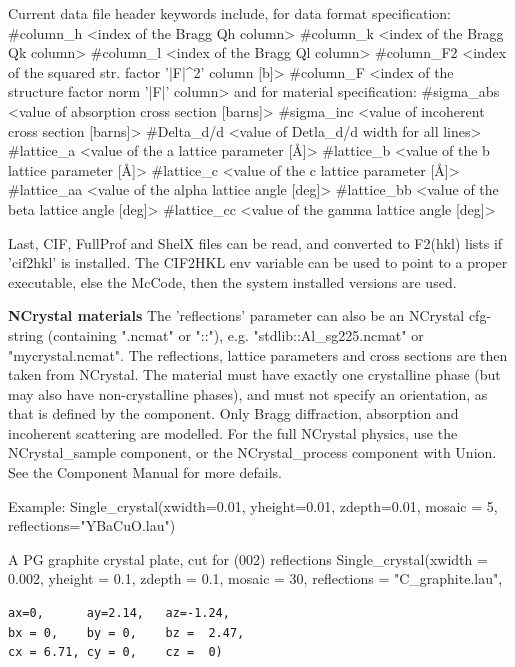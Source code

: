 Current data file header keywords include, for data format specification: \#column\_h \textless{}index of the Bragg Qh column\textgreater{} \#column\_k \textless{}index of the Bragg Qk column\textgreater{} \#column\_l \textless{}index of the Bragg Ql column\textgreater{} \#column\_F2 \textless{}index of the squared str. factor '|F|\textasciicircum{}2' column [b]\textgreater{} \#column\_F \textless{}index of the structure factor norm '|F|' column\textgreater{} and for material specification: \#sigma\_abs \textless{}value of absorption cross section [barns]\textgreater{} \#sigma\_inc \textless{}value of incoherent cross section [barns]\textgreater{} \#Delta\_d/d \textless{}value of Detla\_d/d width for all lines\textgreater{} \#lattice\_a \textless{}value of the a lattice parameter [\AA{}]\textgreater{} \#lattice\_b \textless{}value of the b lattice parameter [\AA{}]\textgreater{} \#lattice\_c \textless{}value of the c lattice parameter [\AA{}]\textgreater{} \#lattice\_aa \textless{}value of the alpha lattice angle [deg]\textgreater{} \#lattice\_bb \textless{}value of the beta lattice angle [deg]\textgreater{} \#lattice\_cc \textless{}value of the gamma lattice angle [deg]\textgreater{}

Last, CIF, FullProf and ShelX files can be read, and converted to F2(hkl) lists if 'cif2hkl' is installed. The CIF2HKL env variable can be used to point to a proper executable, else the McCode, then the system installed versions are used.

\textbf{NCrystal materials} The 'reflections' parameter can also be an NCrystal cfg-string (containing ".ncmat" or "::"), e.g. "stdlib::Al\_sg225.ncmat" or "mycrystal.ncmat". The reflections, lattice parameters and cross sections are then taken from NCrystal. The material must have exactly one crystalline phase (but may also have non-crystalline phases), and must not specify an orientation, as that is defined by the component. Only Bragg diffraction, absorption and incoherent scattering are modelled. For the full NCrystal physics, use the NCrystal\_sample component, or the NCrystal\_process component with Union. See the Component Manual for more defails.

Example: Single\_crystal(xwidth=0.01, yheight=0.01, zdepth=0.01, mosaic = 5, reflections="YBaCuO.lau")

A PG graphite crystal plate, cut for (002) reflections Single\_crystal(xwidth = 0.002, yheight = 0.1, zdepth = 0.1, mosaic = 30, reflections = "C\_graphite.lau",

\begin{verbatim}
ax=0,      ay=2.14,   az=-1.24,
bx = 0,    by = 0,    bz =  2.47,
cx = 6.71, cy = 0,    cz =  0)
\end{verbatim}

